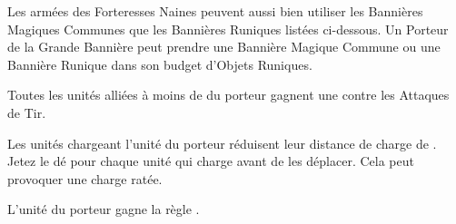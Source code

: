 \begin{multicols}{2}
Les armées des Forteresses Naines peuvent aussi bien utiliser les Bannières Magiques Communes que les Bannières Runiques listées ci-dessous. Un Porteur de la Grande Bannière peut prendre une Bannière Magique Commune ou une Bannière Runique dans son budget d'Objets Runiques.

\startpricelist

Toutes les unités alliées à moins de  du porteur gagnent une  contre les Attaques de Tir.

Les unités chargeant l'unité du porteur réduisent leur distance de charge de . Jetez le dé pour chaque unité qui charge avant de les déplacer. Cela peut provoquer une charge ratée.

L'unité du porteur gagne la règle \vanguard{}.

\endpricelist

\end{multicols}
\closearmynewsection













\quickrefsheettitle

